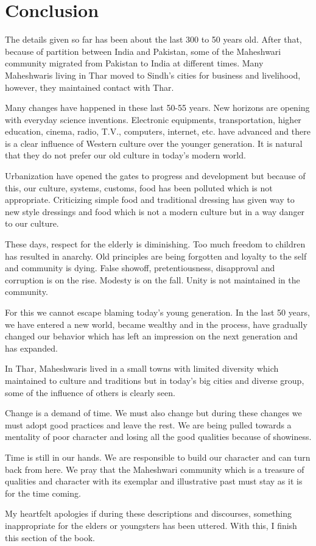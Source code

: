 \chapter{Conclusion}

The details given so far has been about the last 300 to 50 years old. After
that, because of partition between India and Pakistan, some of the Maheshwari
community migrated from Pakistan to India at different times. Many Maheshwaris
living in Thar moved to Sindh's cities for business and livelihood, however,
they maintained contact with Thar. 

Many changes have happened in these last 50-55 years. New horizons are opening
with everyday science inventions. Electronic equipments, transportation, higher
education, cinema, radio, T.V., computers, internet, etc. have advanced and
there is a clear influence of Western culture over the younger generation. It
is natural that they do not prefer our old culture in today's modern world. 

Urbanization have opened the gates to progress and development but because of
this, our culture, systems, customs, food has been polluted which is not
appropriate. Criticizing simple food and traditional dressing has given way to
new style dressings and food which is not a modern culture but in a way danger
to our culture.

These days, respect for the elderly is diminishing. Too much freedom to
children has resulted in anarchy. Old principles are being forgotten and
loyalty to the self and community is dying. False showoff, pretentiousness,
disapproval and corruption is on the rise. Modesty is on the fall. Unity is not
maintained in the community. 

For this we cannot escape blaming today's young generation. In the last 50
years, we have entered a new world, became wealthy and in the process, have
gradually changed our behavior which has left an impression on the next
generation and has expanded. 

In Thar, Maheshwaris lived in a small towns with limited diversity which
maintained to culture and traditions but in today's big cities and diverse
group, some of the influence of others is clearly seen. 

Change is a demand of time. We must also change but during these changes we
must adopt good practices and leave the rest. We are being pulled towards a
mentality of poor character and losing all the good qualities because of
showiness.

Time is still in our hands. We are responsible to build our character and can
turn back from here. We pray that the Maheshwari community which is a treasure
of qualities and character with its exemplar and illustrative past must stay as
it is for the time coming.

My heartfelt apologies if during these descriptions and discourses, something
inappropriate for the elders or youngsters has been uttered. With this, I
finish this section of the book. 
